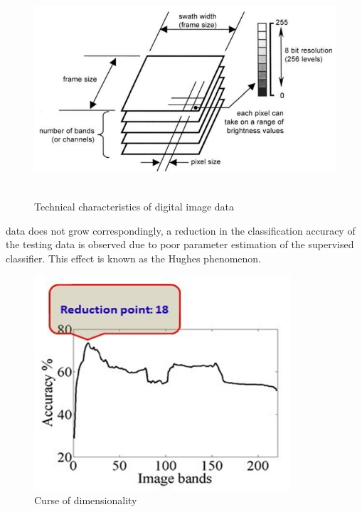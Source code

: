 \documentclass[document.tex]{subfiles}
\begin{document}
\begin{figure}[H]
	\begin{center}
		\includegraphics[height=8.0cm]{imgs/capture.png}
	\end{center}
	\caption{Technical characteristics of
		digital image data\cite{3}}
	\label{fig: Technical characteristics of
		digital image data}
\end{figure}

 \noindent data does not grow correspondingly, a reduction in the classification accuracy of the testing data is observed due to poor parameter estimation of the supervised classifier. This effect is known as the Hughes phenomenon\cite{1}.
 
\begin{figure}[H]
	\begin{center}
		\includegraphics[height=8.0cm]{imgs/curse.png}
	\end{center}
	\caption{Curse of dimensionality\cite{9}}
	\label{fig: Curse of dimensionality}
\end{figure}
\end{document}
